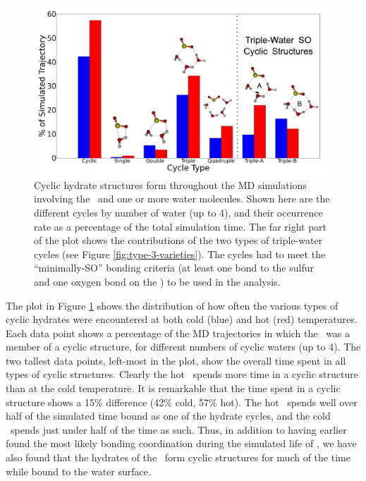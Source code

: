 \begin{figure}[h!]
	\begin{center}
		\includegraphics[scale=1.0]{images/cycles/SO-cycle-breakdown-with-cartoons-small.png}
		\caption{Cyclic hydrate structures form throughout the MD simulations involving the \suldiox~and one or more water molecules. Shown here are the different cycles by number of water (up to 4), and their occurrence rate as a percentage of the total simulation time. The far right part of the plot shows the contributions of the two types of triple-water cycles (see Figure \ref{fig:type-3-varieties}). The cycles had to meet the ``minimally-SO'' bonding criteria (at least one bond to the sulfur and one oxygen bond on the \suldiox) to be used in the analysis.}
		\label{fig:cyclic-breakdown}
	\end{center}
\end{figure}

The plot in Figure \ref{fig:cyclic-breakdown} shows the distribution of how often the various types of cyclic hydrates were encountered at both cold (blue) and hot (red) temperatures. Each data point shows a percentage of the MD trajectories in which the \suldiox~was a member of a cyclic structure, for different numbers of cyclic waters (up to 4). The two tallest data points, left-most in the plot, show the overall time spent in all types of cyclic structures. Clearly the hot \suldiox~spends more time in a cyclic structure than at the cold temperature. It is remarkable that the time spent in a cyclic structure shows a 15\% difference (42\% cold, 57\% hot). The hot \suldiox~spends well over half of the simulated time bound as one of the hydrate cycles, and the cold \suldiox~spends just under half of the time as such. Thus, in addition to having earlier found the most likely bonding coordination during the simulated life of \suldiox, we have also found that the hydrates of the \suldiox~form cyclic structures for much of the time while bound to the water surface.

